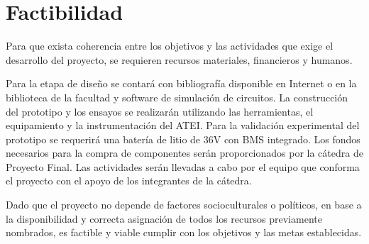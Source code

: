 \section{Factibilidad}

Para que exista coherencia entre los objetivos y las actividades que exige el desarrollo del proyecto,
se requieren recursos materiales, financieros y humanos. 

Para la etapa de diseño se contará con bibliografía disponible en Internet o en la biblioteca de la facultad y software de simulación de circuitos.
La construcción del prototipo y los ensayos se realizarán utilizando las herramientas, el equipamiento y la instrumentación del ATEI. 
Para la validación experimental del prototipo se requerirá una batería de litio de 36V con BMS integrado. 
Los fondos necesarios para la compra de componentes serán proporcionados por la cátedra de Proyecto Final.
Las actividades serán llevadas a cabo por el equipo que conforma el proyecto con el apoyo de los integrantes de la cátedra.

Dado que el proyecto no depende de factores socioculturales o políticos, en base a la disponibilidad y correcta asignación
de todos los recursos previamente nombrados, es factible y viable cumplir con los objetivos y las metas establecidas. 